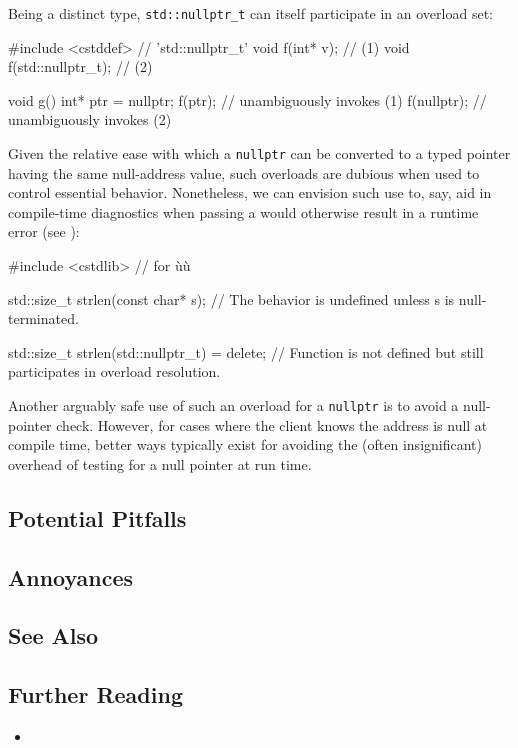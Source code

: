 Being a distinct type, \lstinline!std::nullptr_t! can itself participate
in an overload set:

\begin{emcppslisting}
#include  <cstddef> // 'std::nullptr_t'
void f(int* v);          // (1)
void f(std::nullptr_t);  // (2)

void g()
{
    int* ptr = nullptr;
    f(ptr);      // unambiguously invokes (1)
    f(nullptr);  // unambiguously invokes (2)
}
\end{emcppslisting}


\noindent Given the relative ease with which a \lstinline!nullptr! can be
converted to a typed pointer having the same null-address value, such
overloads are dubious when used to control essential behavior.
Nonetheless, we can envision such use to, say, aid in compile-time
diagnostics when passing a  would otherwise result in
a runtime error (see
):

\begin{emcppshiddenlisting}[emcppsbatch=e4]
#include <cstdlib>  // for ù{}ù
\end{emcppshiddenlisting}
\begin{emcppslisting}[emcppsbatch=e4]
std::size_t strlen(const char* s);
    // The behavior is undefined unless s is null-terminated.

std::size_t strlen(std::nullptr_t) = delete;
    // Function is not defined but still participates in overload resolution.
\end{emcppslisting}


\noindent Another arguably safe use of such an overload for a \lstinline!nullptr! is
to avoid a null-pointer check. However, for cases where the client knows the address is null at compile time, better ways typically exist for avoiding the (often
insignificant) overhead of testing for a null pointer at run time.

\subsection[Potential Pitfalls]{Potential Pitfalls}\label{potential-pitfalls}

\hspace*{\fill}

\subsection[Annoyances]{Annoyances}\label{annoyances}

\hspace*{\fill}

\subsection[See Also]{See Also}\label{see-also}

\hspace*{\fill}

\subsection[Further Reading]{Further Reading}\label{further-reading}

\begin{itemize}
\item{\cite{meyers15a}}
\end{itemize}

